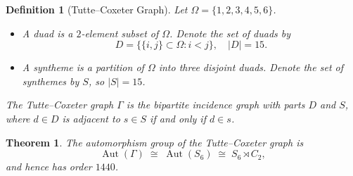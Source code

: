 \documentclass[12pt,a4paper,openany]{book}
\newtheorem{theorem}{Theorem}[section]
\newtheorem{definition}{Definition}[section]
\begin{document}
\begin{definition}[Tutte--Coxeter Graph]
Let $\Omega=\{1,2,3,4,5,6\}$.
\begin{itemize}
  \item A \emph{duad} is a $2$-element subset of $\Omega$. Denote the set of duads by
  \[
    D=\bigl\{\{i,j\}\subset \Omega : i<j \bigr\}, \quad |D|=15.
  \]
  \item A \emph{syntheme} is a partition of $\Omega$ into three disjoint duads. Denote the set of synthemes by $S$, so $|S|=15$.
\end{itemize}
The \emph{Tutte--Coxeter graph} $\Gamma$ is the bipartite incidence graph with parts $D$ and $S$, where $d\in D$ is adjacent to $s\in S$ if and only if $d\in s$.
\end{definition}

\begin{theorem}
The automorphism group of the Tutte--Coxeter graph is
\[
  \operatorname{Aut}(\Gamma) \;\cong\; \operatorname{Aut}(S_6) \;\cong\; S_6 \rtimes C_2,
\]
and hence has order $1440$.
\end{theorem}
\end{document}
